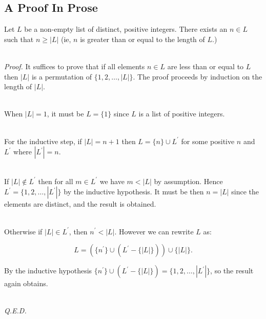 \documentclass{beamer}
\begin{document}
\subsection{A Proof In Prose}
\begin{frame}{\insertsubsectionhead}

\begin{theorem}
  Let \(L\) be a non-empty list of distinct, positive integers.  There
  exists an \(n \in L\) such that \(n\geq \left|L\right|\) (ie, \(n\)
  is greater than or equal to the length of \(L\).) \\~\
\end{theorem}

\emph{Proof.} It suffices to prove that if all elements \(n \in L\)
are less than or equal to \(L\) then \(|L|\) is a permutation of
\(\{1,2,\ldots,\left|L\right|\}\).  The proof proceeds by induction on
the length of \(|L|\). \\~\

When \(\left|L\right| = 1\), it must be \(L=\{1\}\) since \(L\) is a
list of positive integers. \\~\

\framebreak

For the inductive step, if \(|L| = n + 1\) then
\(L = \{n\} \cup L^\prime\) for some positive \(n\) and \(L^\prime\)
where \(|L^\prime| = n\). \\~\


If \(|L| \not\in L^\prime\) then for all \(m \in L^\prime\) we have
\(m <|L|\) by assumption. Hence
\(L^\prime = \{1,2,\ldots, |L^\prime|\}\) by the inductive
hypothesis. It must be then \(n = |L|\) since the elements are
distinct, and the result is obtained.\\~\

Otherwise if \(|L| \in L^\prime\), then \(n^\prime <|L|\).  However we
can rewrite \(L\) as:

\[L = (\{n^\prime\} \cup (L^\prime - \{|L|\})) \cup \{|L|\}. \]

By the inductive hypothesis
\(\{n^\prime\} \cup (L^\prime - \{|L|\}) = \{1,2,\ldots,
|L^\prime|\}\), so the result again obtains.\\~\

\emph{Q.E.D.}
\end{frame}
\end{document}
